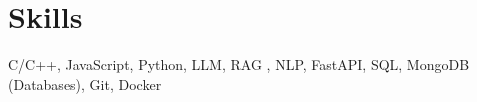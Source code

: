 \section*{Skills}
C/C++, JavaScript, Python, LLM, RAG , NLP, FastAPI, SQL, MongoDB (Databases), Git, Docker

\vspace{-6.5pt}
